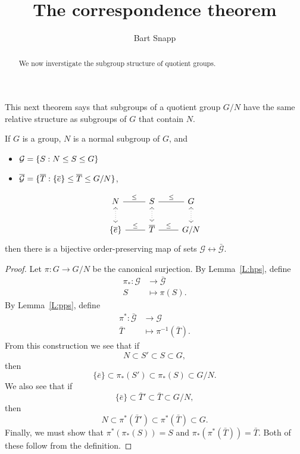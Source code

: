 \documentclass{ximera}
\author{Bart Snapp}
\title{The correspondence theorem}
\begin{document}
\begin{abstract}
  We now inverstigate the subgroup structure of quotient groups.
\end{abstract}
\maketitle

This next theorem says that subgroups of a quotient group $G/N$ have
the same relative structure as subgroups of $G$ that contain $N$.

\begin{theorem}
  If $G$ is a group, $N$ is a normal subgroup of $G$, and
  \begin{itemize}
  \item $\mathcal{G} = \{S:N\leq S\leq G\}$
  \item $\mathcal{\overline{G}} = \{\overline{T}:\{\overline{e}\}\leq \overline{T}\leq G/N\}$,
  \end{itemize}
  \[
  \begin{tikzcd}
    N \ar[r,-,"\subgp"] \ar[d,<->,dotted]& S\ar[r,-,"\subgp"] \ar[d,<->,dotted]& G \ar[d,<->,dotted]\\
    \{\bar{e}\} \ar[r,-,"\subgp"] & \bar{T} \ar[r,-,"\subgp"] & G/N
  \end{tikzcd}
  \]
  then there is a bijective order-preserving map of sets
  $\mathcal{G}\leftrightarrow\mathcal{\bar{G}}$.
  \begin{proof}
    Let $\pi:G\to G/N$ be the canonical surjection.  By
    Lemma~\ref{L:hps}, define
    \begin{align*}
    \pi_*:\mathcal{G} &\to \bar{\mathcal{G}}\\
    S &\mapsto \pi(S).
    \end{align*}
    By Lemma~\ref{L:pps}, define
    \begin{align*}
    \pi^*:\bar{\mathcal{G}} &\to \mathcal G\\
    \bar{T} &\mapsto \pi^{-1}(\bar{T}).
    \end{align*}
    From this construction we see that if
    \[
    N \subset S'\subset S \subset G,
    \]
    then
    \[
    \{\bar{e}\}\subset \pi_*(S') \subset \pi_*(S)\subset G/N.
    \]
    We also see that if
    \[
    \{\bar{e}\} \subset \bar{T}\hspace{0em}' \subset \bar{T} \subset G/N,
    \]
    then
    \[
    N \subset \pi^*(\bar{T}\hspace{0em}')\subset \pi^*(\bar{T}) \subset G.
    \]
    Finally, we must show that $\pi^*(\pi_*(S)) = S$ and
    $\pi_*(\pi^*(\bar T)) = \bar{T}$. Both of these follow from the
    definition.
  \end{proof}
\end{theorem}
\end{document}
